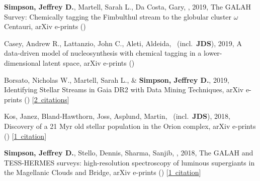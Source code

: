 \item[{\color{numcolor}\scriptsize5}] \textbf{Simpson, Jeffrey D.}, Martell, Sarah L., Da Costa, Gary, \etal, 2019, The GALAH Survey: Chemically tagging the Fimbulthul stream to the globular cluster $\omega$ Centauri, arXiv e-prints ()

\item[{\color{numcolor}\scriptsize4}] Casey, Andrew R., Lattanzio, John C., Aleti, Aldeida, \etal\ (incl.\ \textbf{JDS}), 2019, A data-driven model of nucleosynthesis with chemical tagging in a lower-dimensional latent space, arXiv e-prints ()

\item[{\color{numcolor}\scriptsize3}] Borsato, Nicholas W., Martell, Sarah L., \& \textbf{Simpson, Jeffrey D.}, 2019, Identifying Stellar Streams in Gaia DR2 with Data Mining Techniques, arXiv e-prints () [\href{https://ui.adsabs.harvard.edu/#abs/2019arXiv190702527B}{2~citations}]

\item[{\color{numcolor}\scriptsize2}] Kos, Janez, Bland-Hawthorn, Joss, Asplund, Martin, \etal\ (incl.\ \textbf{JDS}), 2018, Discovery of a 21 Myr old stellar population in the Orion complex, arXiv e-prints () [\href{https://ui.adsabs.harvard.edu/#abs/2018arXiv181111762K}{1~citation}]

\item[{\color{numcolor}\scriptsize1}] \textbf{Simpson, Jeffrey D.}, Stello, Dennis, Sharma, Sanjib, \etal, 2018, The GALAH and TESS-HERMES surveys: high-resolution spectroscopy of luminous supergiants in the Magellanic Clouds and Bridge, arXiv e-prints () [\href{https://ui.adsabs.harvard.edu/#abs/2018arXiv180405900S}{1~citation}]